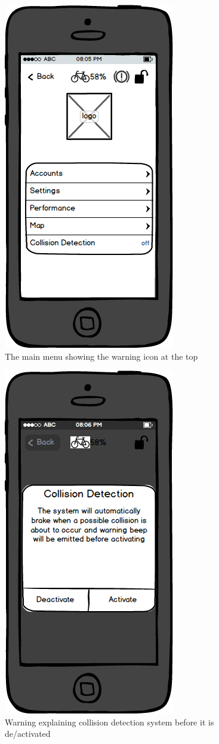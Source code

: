 \documentclass[a4paper]{report}
\begin{document}
\clearpage
\begin{figure}
\centering
\includegraphics[scale=0.9]{figures/prototype_2/main_brake_warn}
\caption{The main menu showing the warning icon at the top}
\end{figure}
\clearpage
\begin{figure}
\centering
\includegraphics[scale=0.8]{figures/prototype_2/collision_activate}
\caption{Warning explaining collision detection system before it is de/activated}
\end{figure}
\end{document}
